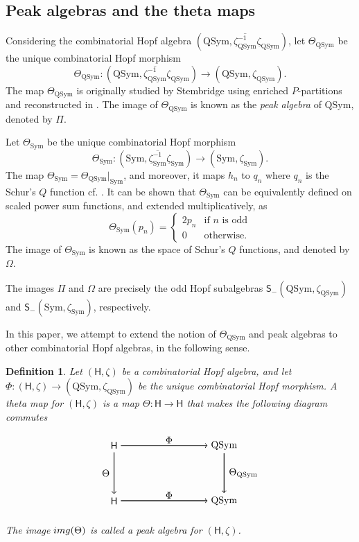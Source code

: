 \documentclass[12pt]{amsart}
\newtheorem{definition}[theorem]{Definition}
\numberwithin{equation}{section}
\newcommand{\QSym}{\mathrm{QSym}}
\newcommand{\Sym}{\mathrm{Sym}}
\newcommand{\sfS}{\mathsf{S}}
\begin{document}
\subsection{Peak algebras and the theta maps}

Considering the combinatorial Hopf algebra  $(\QSym,\overline{\zeta_\QSym^{-1}}\zeta_\QSym)$, let $\Theta_\QSym$ be the unique combinatorial Hopf morphism
$$\Theta_\QSym:(\QSym,\overline{\zeta_\QSym^{-1}}\zeta_\QSym)\to(\QSym,\zeta_\QSym).$$
The map $\Theta_\QSym$ is originally studied by Stembridge using enriched $P$-partitions \cite{S97} and reconstructed in \cite{A06}. The image of $\Theta_\QSym$ is known as the {\it peak algebra} of $\QSym$, denoted by $\Pi$.

Let $\Theta_\Sym$ be the unique combinatorial Hopf morphism
$$\Theta_\Sym:(\Sym,\overline{\zeta_\Sym^{-1}}\zeta_\Sym)\to(\Sym,\zeta_\Sym).$$
The map $\Theta_{\Sym}=\Theta_{\QSym}|_{\Sym}$, and moreover, it maps $h_n$ to $q_n$ where $q_n$ is the Schur's $Q$ function cf. \cite{M95, S11}. It can be shown that $\Theta_\Sym$ can be equivalently defined on scaled power sum functions, and extended multiplicatively, as
$$\Theta_\Sym(p_n)=\left\{\begin{array}{cc}
2p_n & \text{if }n \text{ is odd}\\
0& \text{otherwise.}
\end{array}\right.$$
The image of $\Theta_\Sym$ is known as the space of Schur's $Q$ functions, and denoted by $\Omega$.

The images $\Pi$ and $\Omega$ are precisely the odd Hopf subalgebras $\sfS_{-}(\QSym,\zeta_\QSym)$ and $\sfS_{-}(\Sym,\zeta_\Sym)$, respectively.

In this paper, we attempt to extend the notion of $\Theta_\QSym$ and peak algebras to other combinatorial Hopf algebras, in the following sense.

\begin{definition}
	Let $(\mathsf{H},\zeta)$ be a combinatorial Hopf algebra, and let $\Phi:(\mathsf{H},\zeta)\to(\QSym,\zeta_\QSym)$ be the unique combinatorial Hopf morphism. A {\it theta map} for $(\mathsf{H},\zeta)$ is a map $\Theta:\mathsf{H}\to\mathsf{H}$ that makes the following diagram commutes
	
	$$
	\begin{tikzpicture}
	\node(TV) at (0,0){$\mathsf{H}$};
	\node(Sym) at (4,0){$\QSym$};
	\node(OV) at (0,-2){$\mathsf{H}$};
	\node(Omega) at (4,-2){$\QSym$};
	
	\draw[thick,->]  (TV)->(Sym);
	\draw[thick,->]  (OV)->(Omega);
	\draw[thick,->]   (TV)->(OV);
	\draw[thick,->]   (Sym)->(Omega);
	
	\node(Phi) at (2,0.2){$\Phi$};
	\node(Phi) at (2,-1.8){$\Phi$};
	\node(thetaV) at (-0.3,-1){$\Theta$};
	\node(thetaV) at (4.7,-1){$\Theta_\QSym$};
	\end{tikzpicture} 
	$$
	
	The image ${\rm img}(\Theta)$ is called a peak algebra for $(\mathsf{H},\zeta)$.
\end{definition}
\end{document}
